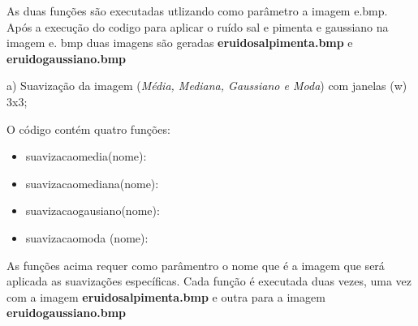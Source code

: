 \documentclass[10pt,a4paper]{article}
\begin{document}
\begin{flushleft}
As duas funções são executadas utlizando como parâmetro a imagem e.bmp. Após a execução do codigo para aplicar o ruído sal e pimenta e gaussiano na imagem e. bmp duas imagens são geradas \textbf{e\textunderscore ruido\textunderscore salpimenta.bmp} e  \textbf{e\textunderscore ruido\textunderscore gaussiano.bmp} 
\end{flushleft}

\begin{figure}[H]
    \centering
    \qquad
\end{figure}

\begin{flushleft}
a) Suavização da imagem (\textit {Média, Mediana, Gaussiano e Moda}) com janelas (w) 3x3;
\end{flushleft}

\begin{flushleft}
O código contém quatro funções:
\end{flushleft}

\begin{itemize}
    \item {\ttfamily suavizacao\textunderscore media(nome):}
    \item {\ttfamily suavizacao\textunderscore mediana(nome):}
    \item {\ttfamily suavizacao\textunderscore gausiano(nome):}
    \item {\ttfamily suavizacao\textunderscore moda (nome):}
\end{itemize}

\begin{flushleft}
As funções acima requer como parâmentro o nome que é a imagem que será aplicada as suavizações específicas. Cada função é executada duas vezes, uma vez com a imagem \textbf{e\textunderscore ruido\textunderscore salpimenta.bmp} e outra para a imagem \textbf{e\textunderscore ruido\textunderscore gaussiano.bmp}
\end{flushleft}
\end{document}
